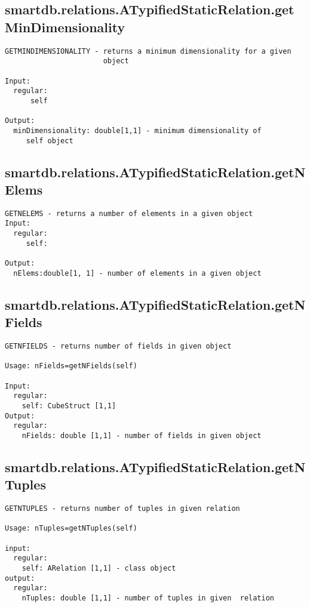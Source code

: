 \subsection{\texorpdfstring{smartdb.relations.ATypifiedStaticRelation.getMinDimensionality}{getMinDimensionality}}\label{method:smartdb.relations.ATypifiedStaticRelation.getMinDimensionality}
\begin{verbatim}
GETMINDIMENSIONALITY - returns a minimum dimensionality for a given
                       object

Input:
  regular:
      self

Output:
  minDimensionality: double[1,1] - minimum dimensionality of
     self object
\end{verbatim}
\subsection{\texorpdfstring{smartdb.relations.ATypifiedStaticRelation.getNElems}{getNElems}}\label{method:smartdb.relations.ATypifiedStaticRelation.getNElems}
\begin{verbatim}
GETNELEMS - returns a number of elements in a given object
Input:
  regular:
     self:

Output:
  nElems:double[1, 1] - number of elements in a given object
\end{verbatim}
\subsection{\texorpdfstring{smartdb.relations.ATypifiedStaticRelation.getNFields}{getNFields}}\label{method:smartdb.relations.ATypifiedStaticRelation.getNFields}
\begin{verbatim}
GETNFIELDS - returns number of fields in given object

Usage: nFields=getNFields(self)

Input:
  regular:
    self: CubeStruct [1,1]
Output:
  regular:
    nFields: double [1,1] - number of fields in given object
\end{verbatim}
\subsection{\texorpdfstring{smartdb.relations.ATypifiedStaticRelation.getNTuples}{getNTuples}}\label{method:smartdb.relations.ATypifiedStaticRelation.getNTuples}
\begin{verbatim}
GETNTUPLES - returns number of tuples in given relation

Usage: nTuples=getNTuples(self)

input:
  regular:
    self: ARelation [1,1] - class object
output:
  regular:
    nTuples: double [1,1] - number of tuples in given  relation
\end{verbatim}

